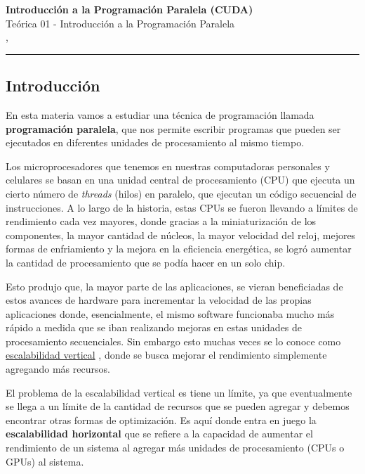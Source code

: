 



\begin{center}
  \LARGE\textbf{Introducción a la Programación Paralela (CUDA)} \\
  \Large{Teórica 01 - Introducción a la Programación Paralela} \\
  \normalsize{\currentsemester, \currentyear} \\
  \vspace{1em}
  \hrule
\end{center}

\vspace{1em}

\setcounter{section}{1}

\subsection{Introducción}
\label{sec:introduccion}

En esta materia vamos a estudiar una técnica de programación llamada \textbf{programación paralela}, que nos permite
escribir programas que pueden ser ejecutados en diferentes unidades de procesamiento al mismo tiempo.

Los microprocesadores que tenemos en nuestras computadoras personales y celulares se basan en una unidad central de
procesamiento (CPU) que ejecuta un cierto número de \textit{threads} (hilos) en paralelo, que ejecutan un código
secuencial de instrucciones. A lo largo de la historia, estas CPUs se fueron llevando a límites de rendimiento cada vez
mayores, donde gracias a la miniaturización de los componentes, la mayor cantidad de núcleos, la mayor velocidad del
reloj, mejores formas de enfriamiento y la mejora en la eficiencia energética, se logró aumentar la cantidad de
procesamiento que se podía hacer en un solo chip.

Esto produjo que, la mayor parte de las aplicaciones, se vieran beneficiadas de estos avances de hardware para
incrementar la velocidad de las propias aplicaciones donde, esencialmente, el mismo software funcionaba mucho más rápido
a medida que se iban realizando mejoras en estas unidades de procesamiento secuenciales. Sin embargo esto muchas veces
se lo conoce como \href{https://es.wikipedia.org/wiki/Escalabilidad#Escalabilidad_vertical}{escalabilidad vertical} ,
donde se busca mejorar el rendimiento simplemente agregando más recursos.

El problema de la escalabilidad vertical es tiene un límite, ya que eventualmente se llega a un límite de la cantidad
de recursos que se pueden agregar y debemos encontrar otras formas de optimización. Es aquí donde entra en juego la
\textbf{escalabilidad horizontal} que se refiere a la capacidad de aumentar el rendimiento de un sistema al agregar más
unidades de procesamiento (CPUs o GPUs) al sistema.


